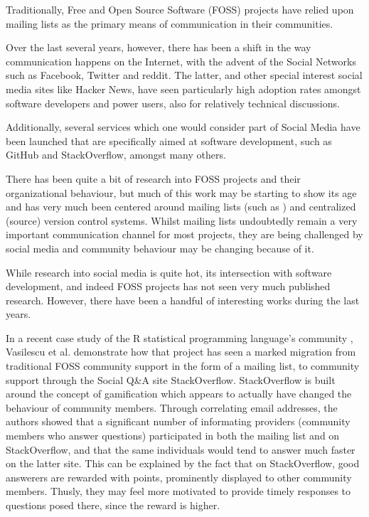 \documentclass[a4paper,11pt]{article} %
\begin{document}
Traditionally, Free and Open Source Software (FOSS) projects have
relied upon mailing lists as the primary means of communication in
their communities. %

Over the last several years, however, there has been a shift in the
way communication happens on the Internet, with the advent of the
Social Networks such as Facebook, Twitter and reddit. The latter, and
other special interest social media sites like Hacker News, have seen
particularly high adoption rates amongst software developers and power
users, also for relatively technical discussions.

Additionally, several services which one would consider part of Social
Media have been launched that are specifically aimed at software
development, such as GitHub and StackOverflow, amongst many others.

There has been quite a bit of research into FOSS projects and their
organizational behaviour, but much of this work may be starting to
show its age and has very much been centered around mailing lists
(such as \cite{Oezbek10Cancer, singh2011network}) and centralized (source) version
control systems. Whilst mailing lists undoubtedly remain a very
important communication channel for most projects, they are being
challenged by social media and community behaviour may be changing
because of it.

While research into social media is quite hot, its intersection with
software development, and indeed FOSS projects has not seen very much
published research. However, there have been a handful of interesting
works during the last years.

In a recent case study of the R statistical programming language's
community \cite{Vasilescu14StackOverflow}, Vasilescu et
al. demonstrate how that project has seen a marked migration from
traditional FOSS community support in the form of a mailing list, to
community support through the Social Q\&{}A site
StackOverflow. StackOverflow is built around the concept of
gamification\cite{deterding2011game} which appears to actually have
changed the behaviour of community members. Through correlating email
addresses, the authors showed that a significant number of informating
providers (community members who answer questions) participated in
both the mailing list and on StackOverflow, and that the same
individuals would tend to answer much faster on the latter site. This
can be explained by the fact that on StackOverflow, good answerers are
rewarded with points, prominently displayed to other community
members. Thusly, they may feel more motivated to provide timely
responses to questions posed there, since the reward is higher.
\end{document}
